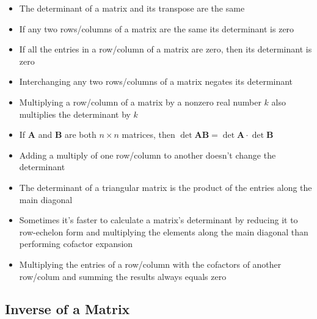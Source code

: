 \documentclass{article}
\begin{document}
\begin{itemize}
  \item The determinant of a matrix and its transpose are the same

  \item If any two rows/columns of a matrix are the same its determinant is zero

  \item If all the entries in a row/column of a matrix are zero, then its determinant is zero

  \item Interchanging any two rows/columns of a matrix negates its determinant

  \item Multiplying a row/column of a matrix by a nonzero real number $k$ also multiplies the determinant by $k$

  \item If $\mathbf{A}$ and $\mathbf{B}$ are both $n \times n$ matrices, then $\det \mathbf{A} \mathbf{B} = \det \mathbf{A} \cdot \det \mathbf{B}$

  \item Adding a multiply of one row/column to another doesn't change the determinant

  \item The determinant of a triangular matrix is the product of the entries along the main diagonal

  \item Sometimes it's faster to calculate a matrix's determinant by reducing it to row-echelon form and multiplying the elements along the main diagonal than performing cofactor expansion

  \item Multiplying the entries of a row/column with the cofactors of another row/colum and summing the results always equals zero
\end{itemize}

\subsection{Inverse of a Matrix}
\end{document}
